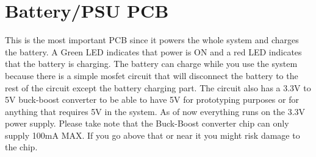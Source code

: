 \documentclass{article}
\begin{document}
 \section{Battery/PSU PCB}
 This is the most important PCB since it powers the whole system and charges the battery. A Green LED indicates that power is ON and a red LED indicates that the battery is charging. The battery can charge while you use the system because there is a simple mosfet circuit that will disconnect the battery to the rest of the circuit except the battery charging part. \newline\newline
 The circuit also has a 3.3V to 5V buck-boost converter to be able to have 5V for prototyping purposes or for anything that requires 5V in the system. As of now everything runs on the 3.3V power supply. 
\newline
 Please take note that the Buck-Boost converter chip can only supply 100mA MAX. If you go above that or near it you might risk damage to the chip. 
 
\end{document}
